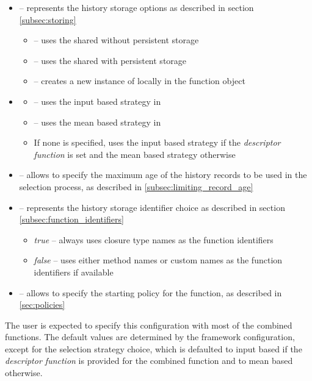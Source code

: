 \begin{itemize}
	\item {} -- represents the history storage options as described in section \ref{subsec:storing}
	\begin{itemize}
		\item {} -- uses the shared  without persistent storage
		\item {} -- uses the shared  with persistent storage
		\item {} -- creates a new instance of  locally in the function object
	\end{itemize}
\item {}
\begin{itemize}
	\item {} -- uses the input based strategy in 
	\item {} -- uses the mean based strategy in 
	\item If none is specified, uses the input based strategy if the \textit{descriptor function} is set and the mean based strategy otherwise
\end{itemize}
\item {} -- allows to specify the maximum age of the history records to be used in the selection process, as described in \ref{subsec:limiting_record_age}
\item {} -- represents the history storage identifier choice as described in section \ref{subsec:function_identifiers}
\begin{itemize}
	\item \textit{true} -- always uses closure type names as the function identifiers
	\item \textit{false} -- uses either method names or custom names as the function identifiers if available
\end{itemize}
\item {} -- allows to specify the starting policy for the function, as described in \ref{sec:policies}
\end{itemize}

The user is expected to specify this configuration with most of the combined functions. The default values are determined by the framework configuration, except for the selection strategy choice, which is defaulted to input based if the \textit{descriptor function} is provided for the combined function and to mean based otherwise.

